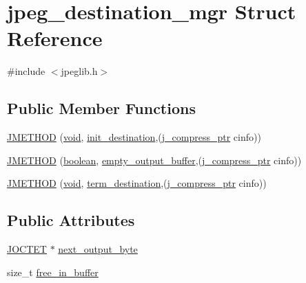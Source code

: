 \hypertarget{structjpeg__destination__mgr}{}\section{jpeg\+\_\+destination\+\_\+mgr Struct Reference}
\label{structjpeg__destination__mgr}


{\ttfamily \#include $<$jpeglib.\+h$>$}

\subsection*{Public Member Functions}
\begin{DoxyCompactItemize}
\item 
\hyperlink{structjpeg__destination__mgr_ae29d14eb632140c7c67eda8c5824383c}{J\+M\+E\+T\+H\+O\+D} (\hyperlink{png_8h_aa8c59027f9ab2769342f248709d68d17}{void}, \hyperlink{jdatadst_8c_abc7ed5278b728c7fd1cb2b00d5297c75}{init\+\_\+destination},(\hyperlink{jpeglib_8h_add2a072c54e3a51550f4975f7ddb91e7}{j\+\_\+compress\+\_\+ptr} cinfo))
\item 
\hyperlink{structjpeg__destination__mgr_a7357b5d5cab543cfa243dd59f101b8f2}{J\+M\+E\+T\+H\+O\+D} (\hyperlink{jmorecfg_8h_a7c6368b321bd9acd0149b030bb8275ed}{boolean}, \hyperlink{jdatadst_8c_ad29423c77a4142a1ec1771aa4a419a09}{empty\+\_\+output\+\_\+buffer},(\hyperlink{jpeglib_8h_add2a072c54e3a51550f4975f7ddb91e7}{j\+\_\+compress\+\_\+ptr} cinfo))
\item 
\hyperlink{structjpeg__destination__mgr_a1158df5e49ecfa2a7d0905eef216afbf}{J\+M\+E\+T\+H\+O\+D} (\hyperlink{png_8h_aa8c59027f9ab2769342f248709d68d17}{void}, \hyperlink{jdatadst_8c_a6501130b84bb53734f08418196d00dc4}{term\+\_\+destination},(\hyperlink{jpeglib_8h_add2a072c54e3a51550f4975f7ddb91e7}{j\+\_\+compress\+\_\+ptr} cinfo))
\end{DoxyCompactItemize}
\subsection*{Public Attributes}
\begin{DoxyCompactItemize}
\item 
\hyperlink{jmorecfg_8h_a356ad249f20e691b520da439f92cccbc}{J\+O\+C\+T\+E\+T} $\ast$ \hyperlink{structjpeg__destination__mgr_a3dac0ab8cc4daeb1efb9fea2e07449c0}{next\+\_\+output\+\_\+byte}
\item 
size\+\_\+t \hyperlink{structjpeg__destination__mgr_a397cc63a089447fe96e35062c4979906}{free\+\_\+in\+\_\+buffer}
\end{DoxyCompactItemize}


